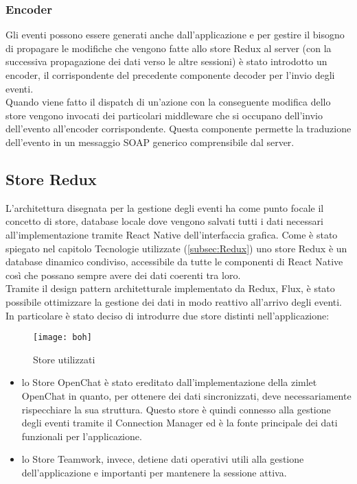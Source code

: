 \subsubsection{Encoder}
Gli eventi possono essere generati anche dall'applicazione e per gestire il bisogno di propagare le modifiche che vengono fatte allo store Redux al server (con la successiva propagazione dei dati verso le altre sessioni) è stato introdotto un encoder, il corrispondente del precedente componente decoder per l'invio degli eventi. \\
Quando viene fatto il dispatch di un'azione con la conseguente modifica dello store vengono invocati dei particolari middleware che si occupano dell'invio dell'evento all'encoder corrispondente. Questa componente permette la traduzione dell'evento in un messaggio SOAP generico comprensibile dal server.

\subsection{Store Redux}
L'architettura disegnata per la gestione degli eventi ha come punto focale il concetto di store, database locale dove vengono salvati tutti i dati necessari all'implementazione tramite React Native dell'interfaccia grafica. Come è stato spiegato nel capitolo Tecnologie utilizzate (\ref{subsec:Redux}) uno store Redux è un database dinamico condiviso, accessibile da tutte le componenti di React Native così che possano sempre avere dei dati coerenti tra loro. \\
Tramite il design pattern architetturale implementato da Redux, Flux, è stato possibile ottimizzare la gestione dei dati in modo reattivo all'arrivo degli eventi. \\
In particolare è stato deciso di introdurre due store distinti nell'applicazione:
\begin{figure}[H] 
	\centering
	\texttt{[image: boh]}
	\caption{Store utilizzati}
\end{figure}
\begin{itemize}
	\item lo Store OpenChat è stato ereditato dall'implementazione della zimlet OpenChat in quanto, per ottenere dei dati sincronizzati, deve necessariamente rispecchiare la sua struttura. Questo store è quindi connesso alla gestione degli eventi tramite il Connection Manager ed è la fonte principale dei dati funzionali per l'applicazione.
	\item lo Store Teamwork, invece, detiene dati operativi utili alla gestione dell'applicazione e importanti per mantenere la sessione attiva.
\end{itemize} 

